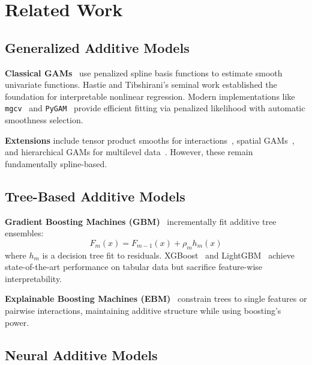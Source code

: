 \documentclass[twocolumn]{article}
\begin{document}
\section{Related Work}
\label{sec:related}

\subsection{Generalized Additive Models}

\textbf{Classical GAMs}~\cite{hastie1990gam} use penalized spline basis functions to estimate smooth univariate functions. Hastie and Tibshirani's seminal work established the foundation for interpretable nonlinear regression. Modern implementations like \texttt{mgcv}~\cite{wood2017gam} and \texttt{PyGAM}~\cite{serven2018pygam} provide efficient fitting via penalized likelihood with automatic smoothness selection.

\textbf{Extensions} include tensor product smooths for interactions~\cite{wood2006gam}, spatial GAMs~\cite{wood2008soap}, and hierarchical GAMs for multilevel data~\cite{pedersen2019hierarchical}. However, these remain fundamentally spline-based.

\subsection{Tree-Based Additive Models}

\textbf{Gradient Boosting Machines (GBM)}~\cite{friedman2001greedy} incrementally fit additive tree ensembles:
\begin{equation}
F_m(x) = F_{m-1}(x) + \rho_m h_m(x)
\end{equation}
where $h_m$ is a decision tree fit to residuals. XGBoost~\cite{chen2016xgboost} and LightGBM~\cite{ke2017lightgbm} achieve state-of-the-art performance on tabular data but sacrifice feature-wise interpretability.

\textbf{Explainable Boosting Machines (EBM)}~\cite{lou2012intelligible,nori2019interpretml} constrain trees to single features or pairwise interactions, maintaining additive structure while using boosting's power.

\subsection{Neural Additive Models}
\end{document}
